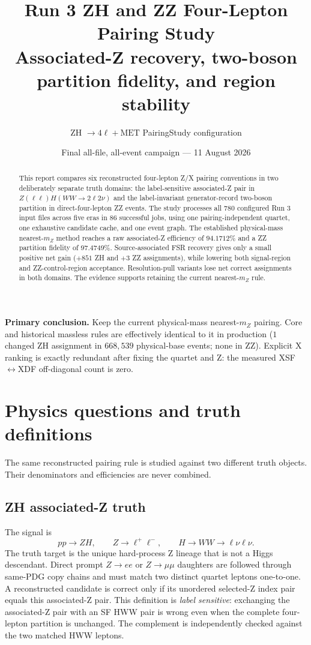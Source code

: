 \documentclass[11pt]{article}
\title{\vspace{-1.2cm}\bfseries\color{cmsdark}
  Run 3 ZH and ZZ Four-Lepton Pairing Study\\[2mm]
  \large Associated-Z recovery, two-boson partition fidelity, and region stability}
\author{ZH $\to 4\ell+\mathrm{MET}$ PairingStudy configuration}
\date{Final all-file, all-event campaign --- 11 August 2026}
\newcommand{\mZ}{m_{Z}}
\begin{document}
\maketitle
\vspace{-0.5em}

\begin{abstract}
This report compares six reconstructed four-lepton Z/X pairing conventions in
two deliberately separate truth domains: the label-sensitive associated-Z pair
in $Z(\ell\ell)H(WW\to2\ell2\nu)$ and the label-invariant generator-record
two-boson partition in direct-four-lepton ZZ events.  The study processes all
780 configured Run 3 input files across five eras in 86 successful jobs, using
one pairing-independent quartet, one exhaustive candidate cache, and one event
graph.  The established physical-mass nearest-$\mZ$ method reaches a raw
associated-Z efficiency of $94.1712\%$ and a ZZ partition fidelity of
$97.4749\%$.  Source-associated FSR recovery gives only a small positive net
gain ($+851$ ZH and $+3$ ZZ assignments), while lowering both signal-region
and ZZ-control-region acceptance.  Resolution-pull variants lose net correct
assignments in both domains.  The evidence supports retaining the current
nearest-$\mZ$ rule.
\end{abstract}

\noindent\colorbox{softgray}{\parbox{0.965\linewidth}{
\textbf{Primary conclusion.} Keep the current physical-mass nearest-$\mZ$
pairing.  Core and historical massless rules are effectively identical to it
in production ($1$ changed ZH assignment in $668{,}539$ physical-base events;
none in ZZ).  Explicit X ranking is exactly redundant after fixing the quartet
and Z: the measured XSF$\leftrightarrow$XDF off-diagonal count is zero.}}

\tableofcontents

\section{Physics questions and truth definitions}

The same reconstructed pairing rule is studied against two different truth
objects.  Their denominators and efficiencies are never combined.

\subsection{ZH associated-Z truth}

The signal is
\[
  pp\to ZH,\qquad Z\to\ell^{+}\ell^{-},\qquad
  H\to WW\to\ell\nu\ell\nu.
\]
The truth target is the unique hard-process Z lineage that is not a Higgs
descendant.  Direct prompt $Z\to ee$ or $Z\to\mu\mu$ daughters are followed
through same-PDG copy chains and must match two distinct quartet leptons
one-to-one.  A reconstructed candidate is correct only if its unordered
selected-Z index pair equals this associated-Z pair.  This definition is
\emph{label sensitive}: exchanging the associated-Z pair with an SF HWW pair
is wrong even when the complete four-lepton partition is unchanged.  The
complement is independently checked against the two matched HWW leptons.
\end{document}
